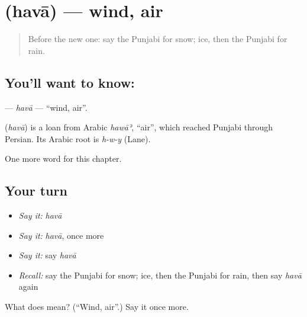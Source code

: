 \section[\texorpdfstring{\pa{ਹਵਾ} (havā)}{ਹਵਾ (havā)}]{ (havā) — wind, air}

\label{lesson:PA-C76-hava}



\begin{quote}
Before the new one: say the Punjabi for snow; ice, then the Punjabi for rain.
\end{quote}

\subsection*{You'll want to know: }
\textbf{} — \emph{havā} — \textquotedblleft{}wind, air\textquotedblright{}.

\begin{cousinweb}
\textbf{} (\emph{havā}) is a loan from Arabic \emph{hawāʾ}, \textquotedblleft{}air\textquotedblright{}, which reached Punjabi through Persian. Its Arabic root is \emph{h-w-y} (Lane).
\end{cousinweb}

\begin{grammarlens}[title={What you've built}]
One more word for this chapter.
\end{grammarlens}

\subsection*{Your turn}
\begin{itemize}
\raggedright
  \item \emph{Say it:} \emph{havā}
  \item \emph{Say it:} \emph{havā}, once more
  \item \emph{Say it:} say \emph{havā}
  \item \emph{Recall:} say the Punjabi for snow; ice, then the Punjabi for rain, then say \emph{havā} again
\end{itemize}

\begin{tcolorbox}[breakable,colback=teal!4,colframe=teal!35!black,title={Before you move on}]
What does  mean? (\textquotedblleft{}Wind, air\textquotedblright{}.) Say it once more.
\end{tcolorbox}
